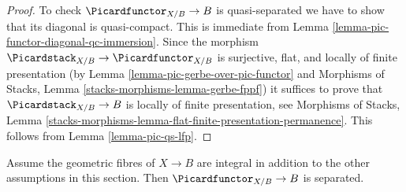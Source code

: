 \begin{proof}
To check $\Picardfunctor_{X/B} \to B$ is quasi-separated we have to
show that its diagonal is quasi-compact. This is immediate from
Lemma \ref{lemma-pic-functor-diagonal-qc-immersion}.
Since the morphism $\Picardstack_{X/B} \to \Picardfunctor_{X/B}$
is surjective, flat, and locally of finite presentation
(by Lemma \ref{lemma-pic-gerbe-over-pic-functor} and
Morphisms of Stacks, Lemma \ref{stacks-morphisms-lemma-gerbe-fppf})
it suffices to prove that $\Picardstack_{X/B} \to B$
is locally of finite presentation, see
Morphisms of Stacks, Lemma
\ref{stacks-morphisms-lemma-flat-finite-presentation-permanence}.
This follows
from Lemma \ref{lemma-pic-qs-lfp}.
\end{proof}

\begin{lemma}
\label{lemma-pic-functor-uniqueness-part}
Assume the geometric fibres of $X \to B$ are integral
in addition to the other assumptions in this section.
Then $\Picardfunctor_{X/B} \to B$ is separated.
\end{lemma}

